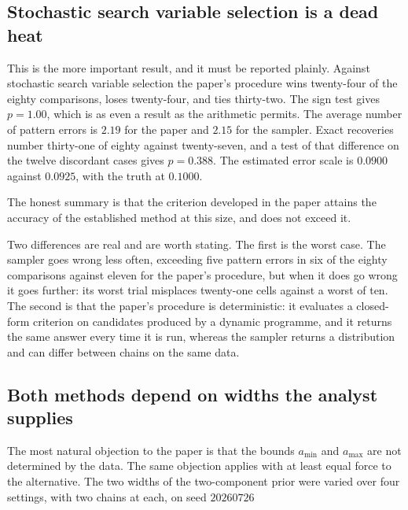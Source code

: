 \subsection{Stochastic search variable selection is a dead heat}

This is the more important result, and it must be reported plainly. Against
stochastic search variable selection the paper's procedure wins twenty-four of the
eighty comparisons, loses twenty-four, and ties thirty-two. The sign test gives
$p = 1.00$, which is as even a result as the arithmetic permits. The average number
of pattern errors is $2.19$ for the paper and $2.15$ for the sampler. Exact
recoveries number thirty-one of eighty against twenty-seven, and a test of that
difference on the twelve discordant cases gives $p = 0.388$. The estimated error
scale is $0.0900$ against $0.0925$, with the truth at $0.1000$.

The honest summary is that the criterion developed in the paper attains the accuracy
of the established method at this size, and does not exceed it.

Two differences are real and are worth stating. The first is the worst case. The
sampler goes wrong less often, exceeding five pattern errors in six of the eighty
comparisons against eleven for the paper's procedure, but when it does go wrong it
goes further: its worst trial misplaces twenty-one cells against a worst of ten. The
second is that
the paper's procedure is deterministic: it evaluates a closed-form criterion on
candidates produced by a dynamic programme, and it returns the same answer every
time it is run, whereas the sampler returns a distribution and can differ between
chains on the same data.

\subsection{Both methods depend on widths the analyst supplies}
\label{sec:sens}

The most natural objection to the paper is that the bounds $a_{\min}$ and
$a_{\max}$ are not determined by the data. The same objection applies with at least
equal force to the alternative. The two widths of the two-component prior were
varied over four settings, with two chains at each, on seed $20260726$

\begin{center}
\footnotesize
{}
\end{center}

